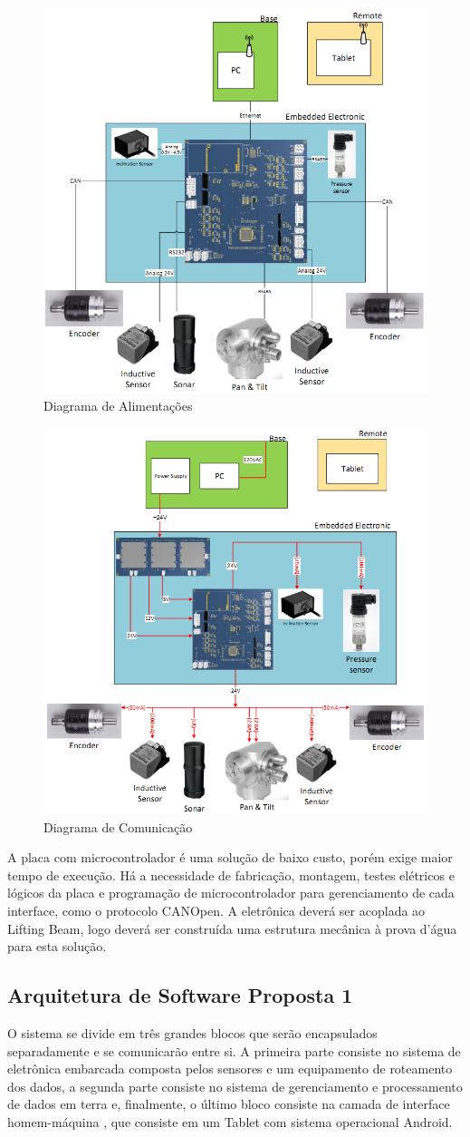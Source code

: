 \begin{figure}[H]
    \centering
    \includegraphics[width=0.5\columnwidth]{figs/eletronica/2.png}
    \caption{Diagrama de Alimentações}
    \label{alimentacao_placa}
\end{figure}

\begin{figure}[H]
    \centering
    \includegraphics[width=0.5\columnwidth]{figs/eletronica/3.png}
    \caption{Diagrama de Comunicação}
    \label{com_placa}
\end{figure}
 
A placa com microcontrolador é uma solução de baixo custo, porém exige maior tempo de execução. Há a necessidade de fabricação, montagem, testes elétricos e lógicos da placa e programação de microcontrolador para gerenciamento de cada interface, como o protocolo CANOpen. 
A eletrônica deverá ser acoplada ao Lifting Beam, logo deverá ser construída uma estrutura mecânica à prova d’água para esta solução.

\subsection{Arquitetura de Software Proposta 1}
O sistema se divide em três grandes blocos que serão encapsulados separadamente
e se comunicarão entre si. A primeira parte consiste no sistema de eletrônica
embarcada composta pelos sensores e um equipamento de roteamento dos dados, a
segunda parte consiste no sistema de gerenciamento e processamento de dados em
terra e, finalmente, o último bloco consiste na camada de interface
homem-máquina , que consiste em um Tablet com sistema operacional Android.

